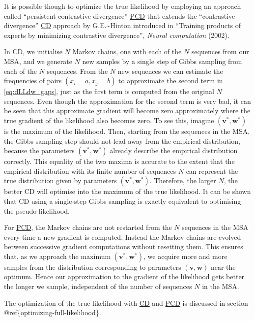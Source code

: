 \documentclass[12pt,a4paper,twoside]{book}
\renewcommand{\v}{\mathbf{v}}
\newcommand{\w}{\mathbf{w}}
\theoremstyle{definition}
\theoremstyle{definition}
\theoremstyle{remark}
\begin{document}
It is possible though to optimize the true likelihood by employing an
approach called ``persistent contrastive divergence''
\protect\hyperlink{abbrev}{PCD} that extends the ``contrastive
divergence'' \protect\hyperlink{abbrev}{CD} approach by
G.E.\textasciitilde{}Hinton introduced in ``Training products of experts
by minimizing contrastive divergence'', \emph{Neural computation}
(2002).

In CD, we initialise \(N\) Markov chains, one with each of the \(N\)
sequences from our MSA, and we generate \(N\) new samples by a single
step of Gibbs sampling from each of the \(N\) sequences. From the \(N\)
new sequences we can estimate the frequencies of pairs
\((x_{i}\!=\! a, x_{j}=b)\) to approximate the second term in
\eqref{eq:dLLdw_gaps}, just as the first term is computed from the
original \(N\) sequences. Even though the approximation for the second
term is very bad, it can be seen that this approximate gradient will
become zero approximately where the true gradient of the likelihood also
becomes zero. To see this, imagine \((\v^*, \w^*)\) is the maximum of
the likelihood. Then, starting from the sequences in the MSA, the Gibbs
sampling step should not lead away from the empirical distribution,
because the parameters \((\v^*, \w^*)\) already describe the empirical
distribution correctly. This equality of the two maxima is accurate to
the extent that the empirical distribution with its finite number of
sequences \(N\) can represent the true distribution given by parameters
\((\v^*, \w^*)\). Therefore, the larger \(N\), the better CD will
optimise into the maximum of the true likelihood. It can be shown that
CD using a single-step Gibbs sampling is exactly equivalent to
optimising the pseudo likelihood.

For \protect\hyperlink{abbrev}{PCD}, the Markov chains are not restarted
from the \(N\) sequences in the MSA every time a new gradient is
computed. Instead the Markov chains are evolved between successive
gradient computations without resetting them. This ensures that, as we
approach the maximum \((\v^*, \w^*)\), we acquire more and more samples
from the distribution corresponding to parameters \((\v,\w)\) near the
optimum. Hence our approximation to the gradient of the likelihood gets
better the longer we sample, independent of the number of sequences
\(N\) in the MSA.

The optimization of the true likelihood with
\protect\hyperlink{abbrev}{CD} and \protect\hyperlink{abbrev}{PCD} is
discussed in section @ref\{optimizing-full-likelihood\}.
\end{document}
